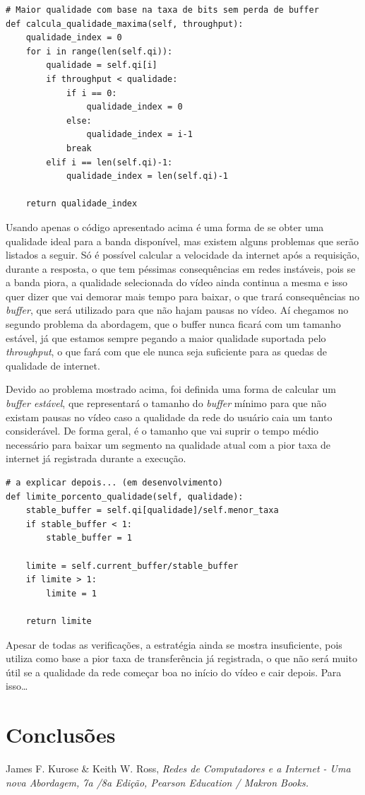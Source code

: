 \documentclass[12pt]{article}
\begin{document}
\begin{lstlisting}
# Maior qualidade com base na taxa de bits sem perda de buffer
def calcula_qualidade_maxima(self, throughput):
    qualidade_index = 0
    for i in range(len(self.qi)):
        qualidade = self.qi[i]
        if throughput < qualidade:
            if i == 0:
                qualidade_index = 0
            else:
                qualidade_index = i-1
            break
        elif i == len(self.qi)-1:
            qualidade_index = len(self.qi)-1

    return qualidade_index
\end{lstlisting}

Usando apenas o código apresentado acima é uma forma de se obter uma qualidade ideal para a banda disponível, mas existem alguns problemas que serão listados a seguir. Só é possível calcular a velocidade da internet após a requisição, durante a resposta, o que tem péssimas consequências em redes instáveis, pois se a banda piora, a qualidade selecionada do vídeo ainda continua a mesma e isso quer dizer que vai demorar mais tempo para baixar, o que trará consequências no \textit{buffer}, que será utilizado para que não hajam pausas no vídeo. Aí chegamos no segundo problema da abordagem, que o buffer nunca ficará com um tamanho estável, já que estamos sempre pegando a maior qualidade suportada pelo \textit{throughput}, o que fará com que ele nunca seja suficiente para as quedas de qualidade de internet.

Devido ao problema mostrado acima, foi definida uma forma de calcular um \textit{buffer estável}, que representará o tamanho do \textit{buffer} mínimo para que não existam pausas no vídeo caso a qualidade da rede do usuário caia um tanto considerável. De forma geral, é o tamanho que vai suprir o tempo médio necessário para baixar um segmento na qualidade atual com a pior taxa de internet já registrada durante a execução.

\begin{lstlisting}
# a explicar depois... (em desenvolvimento)
def limite_porcento_qualidade(self, qualidade):
    stable_buffer = self.qi[qualidade]/self.menor_taxa
    if stable_buffer < 1:
        stable_buffer = 1

    limite = self.current_buffer/stable_buffer
    if limite > 1:
        limite = 1

    return limite
\end{lstlisting}

Apesar de todas as verificações, a estratégia ainda se mostra insuficiente, pois utiliza como base a pior taxa de transferência já registrada, o que não será muito útil se a qualidade da rede começar boa no início do vídeo e cair depois. Para isso\dots

\section{Conclusões}
\lipsum[3]

\begin{thebibliography}{9}

\noindent James F. Kurose \& Keith W. Ross, 
\textit{Redes de Computadores e a Internet - Uma nova Abordagem, 7a /8a Edição, Pearson Education / Makron Books.}

\end{thebibliography}
\end{document}
